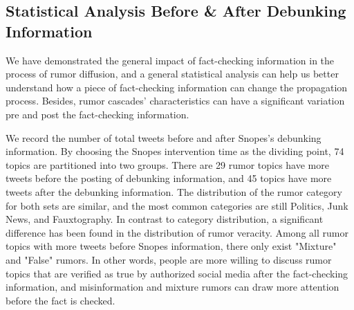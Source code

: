 \documentclass[conference]{IEEEtran}
\begin{document}
	\subsection{Statistical Analysis Before \& After Debunking Information}
	We have demonstrated the general impact of fact-checking information in the process of rumor diffusion, and a general statistical analysis can help us better understand how a piece of fact-checking information can change the propagation process. Besides, rumor cascades' characteristics can have a significant variation pre and post the fact-checking information. 
	
	We record the number of total tweets before and after Snopes's debunking information. By choosing the Snopes intervention time as the dividing point, 74 topics are partitioned into two groups. There are 29 rumor topics have more tweets before the posting of debunking information, and 45 topics have more tweets after the debunking information. The distribution of the rumor category for both sets are similar, and the most common categories are still Politics, Junk News, and Fauxtography. In contrast to category distribution, a significant difference has been found in the distribution of rumor veracity. Among all rumor topics with more tweets before Snopes information, there only exist "Mixture" and "False" rumors. In other words, people are more willing to discuss rumor topics that are verified as true by authorized social media after the fact-checking information, and misinformation and mixture rumors can draw more attention before the fact is checked.
	
\end{document}
